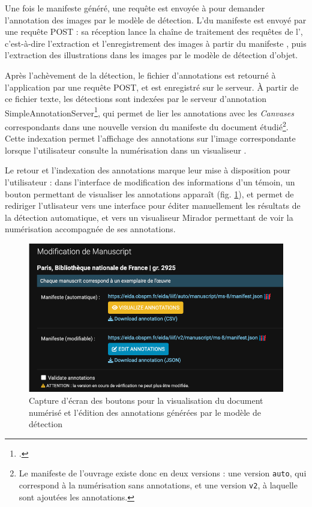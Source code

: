 	Une fois le manifeste \iiif généré, une requête est envoyée à \exapi pour demander l'annotation des images par le modèle de détection. L'\URL du manifeste est envoyé par une requête \http POST : sa réception lance la chaîne de traitement des requêtes de l'\api, c'est-à-dire l'extraction et l'enregistrement des images à partir du manifeste \iiif, puis l'extraction des illustrations dans les images par le modèle de détection d'objet. 
	
	Après l'achèvement de la détection, le fichier d'annotations est retourné à l'application par une requête POST, et est enregistré sur le serveur. À partir de ce fichier texte, les détections sont indexées par le serveur \iiif d'annotation SimpleAnnotationServer\footcite{WelcomeSimpleAnnotation}, qui permet de lier les annotations avec les \textit{Canvases} correspondants dans une nouvelle version du manifeste \iiif du document étudié\footnote{Le manifeste \iiif de l'ouvrage existe donc en deux versions : une version \texttt{auto}, qui correspond à la numérisation sans annotations, et une version \texttt{v2}, à laquelle sont ajoutées les annotations.}. Cette indexation permet l'affichage des annotations sur l'image correspondante lorsque l'utilisateur consulte la numérisation dans un visualiseur \iiif.
	
	Le retour et l'indexation des annotations marque leur mise à disposition pour l'utilisateur : dans l'interface de modification des informations d'un témoin, un bouton permettant de visualiser les annotations apparaît (fig. \ref{fig:eida_buttons}), et permet de rediriger l'utlisateur vers une interface pour éditer manuellement les résultats de la détection automatique, et vers un visualiseur Mirador permettant de voir la numérisation accompagnée de ses annotations.	
	
	\begin{figure}[h]
		\centering
		\includegraphics[width=12cm]{images/eida_buttons.png}
		\caption{Capture d'écran des boutons pour la visualisation du document numérisé et l'édition des annotations générées par le modèle de détection}
		\label{fig:eida_buttons}
	\end{figure}
	
